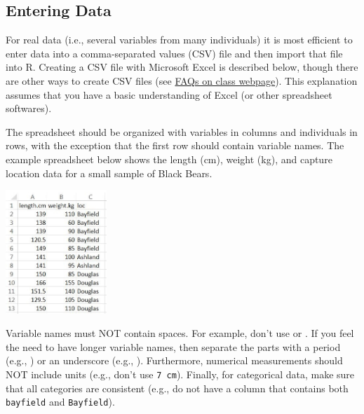 \documentclass[10pt,openany]{book}\usepackage[]{graphicx}\usepackage[]{color}
\begin{document}
\subsection{Entering Data}  \label{sect:REnterData}
For real data (i.e., several variables from many individuals) it is most efficient to enter data into a comma-separated values (CSV) file and then import that file into R. Creating a CSV file with Microsoft Excel is described below, though there are other ways to create CSV files (see \href{http://derekogle.com/NCMTH107/resources/FAQ/}{FAQs on class webpage}). This explanation assumes that you have a basic understanding of Excel (or other spreadsheet softwares).

The spreadsheet should be organized with variables in columns and individuals in rows, with the exception that the first row should contain variable names. The example spreadsheet below shows the length (cm), weight (kg), and capture location data for a small sample of Black Bears.

\begin{center}
  \includegraphics[width=1.5in]{Figs/Data_File_1.jpg}
\end{center}

Variable names must NOT contain spaces. For example, don't use  or . If you feel the need to have longer variable names, then separate the parts with a period (e.g., ) or an underscore (e.g., ). Furthermore, numerical measurements should NOT include units (e.g., don't use \verb"7 cm"). Finally, for categorical data, make sure that all categories are consistent (e.g., do not have a column that contains both \verb"bayfield" and \verb"Bayfield").
\end{document}
